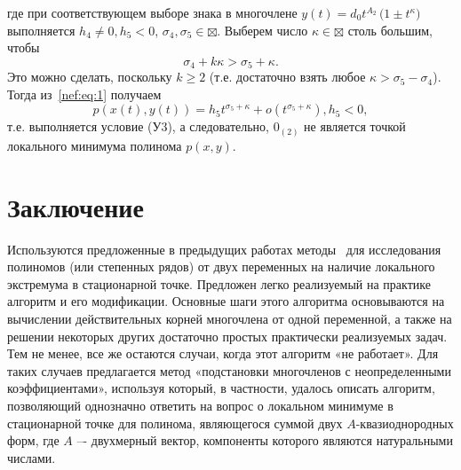 \documentclass[11pt,reqno]{amsart}
\theoremstyle{plain}
\theoremstyle{definition}
\begin{document}
где при соответствующем выборе знака в многочлене $y(t) = d_0t^{A_2}\,\bigl(1\pm t^\kappa\bigr)$ выполняется $h_4 \neq 0, h_5 < 0$, $\sigma_4, \sigma_5 \in \boxtimes$. Выберем число $\kappa \in \boxtimes$ столь большим, чтобы
\[\sigma_4 + k\kappa > \sigma_5 + \kappa.\]
Это можно сделать, поскольку $k \geq 2$ (т.е. достаточно взять любое $\kappa > \sigma_5-\sigma_4$). Тогда из~\eqref{nef:eq:1} получаем
\[p(x(t),y(t)) = h_5t^{\sigma_5+\kappa} + o(t^{\sigma_5+\kappa}), h_5 < 0,\]
т.е. выполняется условие (У3), а следовательно, $0_{(2)}$ не является точкой локального минимума полинома $p(x, y)$.
\section{\textbf{Заключение}}
Используются предложенные в предыдущих работах методы~\cite{nef:1,nef:2,nef:3} для исследования полиномов (или степенных рядов) от двух переменных на наличие локального экстремума в стационарной точке. Предложен легко реализуемый на практике алгоритм и его модификации. Основные шаги этого алгоритма основываются на вычислении действительных корней многочлена от одной переменной, а также на решении некоторых других достаточно простых практически реализуемых задач. Тем не менее, все же остаются случаи, когда этот алгоритм «не работает». Для таких случаев предлагается метод «подстановки многочленов с неопределенными коэффициентами», используя который, в частности, удалось описать алгоритм, позволяющий однозначно ответить на вопрос о локальном минимуме в стационарной точке для полинома, являющегося суммой двух $A$-квазиоднородных форм, где $A$ –- двухмерный вектор, компоненты которого являются натуральными числами.

\end{document}
